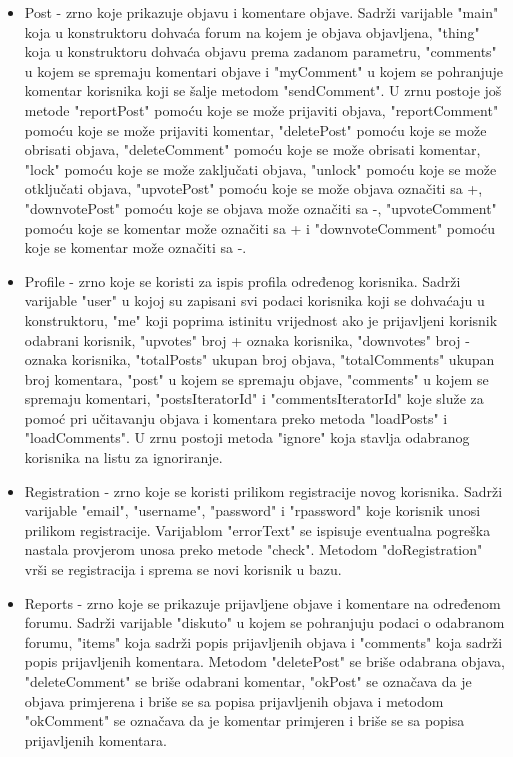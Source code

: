\documentclass{foi}
\begin{document}
\begin{itemize}
\begin{itemize}
	\item Post - zrno koje prikazuje objavu i komentare objave. Sadrži varijable "main" koja u konstruktoru dohvaća forum na kojem je objava objavljena, "thing" koja u konstruktoru dohvaća objavu prema zadanom parametru, "comments" u kojem se spremaju komentari objave i "myComment" u kojem se pohranjuje komentar korisnika koji se šalje metodom "sendComment". U zrnu postoje još metode "reportPost" pomoću koje se može prijaviti objava, "reportComment" pomoću koje se može prijaviti komentar, "deletePost" pomoću koje se može obrisati objava, "deleteComment" pomoću koje se može obrisati komentar, "lock" pomoću koje se može zaključati objava, "unlock" pomoću koje se može otključati objava, "upvotePost" pomoću koje se može objava označiti sa +, "downvotePost" pomoću koje se objava može označiti sa -, "upvoteComment" pomoću koje se komentar može označiti sa + i "downvoteComment" pomoću koje se komentar može označiti sa -.
	\item Profile - zrno koje se koristi za ispis profila određenog korisnika. Sadrži varijable "user" u kojoj su zapisani svi podaci korisnika koji se dohvaćaju u konstruktoru, "me" koji poprima istinitu vrijednost ako je prijavljeni korisnik odabrani korisnik, "upvotes" broj + oznaka korisnika, "downvotes" broj - oznaka korisnika, "totalPosts" ukupan broj objava, "totalComments" ukupan broj komentara, "post" u kojem se spremaju objave, "comments" u kojem se spremaju komentari, "postsIteratorId" i "commentsIteratorId" koje služe za pomoć pri učitavanju objava i komentara preko metoda "loadPosts" i "loadComments". U zrnu postoji metoda "ignore" koja stavlja odabranog korisnika na listu za ignoriranje.
	\item Registration - zrno koje se koristi prilikom registracije novog korisnika. Sadrži varijable "email", "username", "password" i "rpassword" koje korisnik unosi prilikom registracije. Varijablom "errorText" se ispisuje eventualna pogreška nastala provjerom unosa preko metode "check". Metodom "doRegistration" vrši se registracija i sprema se novi korisnik u bazu.
	\item Reports - zrno koje se prikazuje prijavljene objave i komentare na određenom forumu. Sadrži varijable "diskuto" u kojem se pohranjuju podaci o odabranom forumu, "items" koja sadrži popis prijavljenih objava i "comments" koja sadrži popis prijavljenih komentara. Metodom "deletePost" se briše odabrana objava, "deleteComment" se briše odabrani komentar, "okPost" se označava da je objava primjerena i briše se sa popisa prijavljenih objava i metodom "okComment" se označava da je komentar primjeren i briše se sa popisa prijavljenih komentara.

\end{itemize}
\end{itemize}
\end{document}
